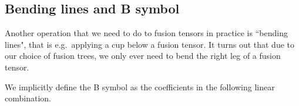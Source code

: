 
\subsection{Bending lines and B symbol}
\label{subsec:nonabelian:topo_data:B_symbol}

Another operation that we need to do to fusion tensors in practice is ``bending lines", that is e.g.~applying a cup below a fusion tensor.
%
It turns out that due to our choice of fusion trees, we only ever need to bend the right leg of a fusion tensor.

We implicitly define the B symbol as the coefficients in the following linear combination.

